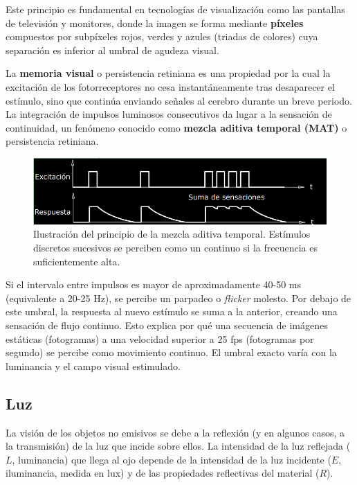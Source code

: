 Este principio es fundamental en tecnologías de visualización como las pantallas de televisión y monitores, donde la imagen se forma mediante \textbf{píxeles} compuestos por subpíxeles rojos, verdes y azules (triadas de colores) cuya separación es inferior al umbral de agudeza visual.

La \textbf{memoria visual} o persistencia retiniana es una propiedad por la cual la excitación de los fotorreceptores no cesa instantáneamente tras desaparecer el estímulo, sino que continúa enviando señales al cerebro durante un breve periodo. La integración de impulsos luminosos consecutivos da lugar a la sensación de continuidad, un fenómeno conocido como \textbf{mezcla aditiva temporal (MAT)} o persistencia retiniana.

\begin{figure}[h]
\centering
\includegraphics[width = \textwidth]{figs/mat.png}
\caption{Ilustración del principio de la mezcla aditiva temporal. Estímulos discretos sucesivos se perciben como un continuo si la frecuencia es suficientemente alta.}
\end{figure}

Si el intervalo entre impulsos es mayor de aproximadamente 40-50 ms (equivalente a 20-25 Hz), se percibe un parpadeo o \textit{flicker} molesto. Por debajo de este umbral, la respuesta al nuevo estímulo se suma a la anterior, creando una sensación de flujo continuo. Esto explica por qué una secuencia de imágenes estáticas (fotogramas) a una velocidad superior a 25 fps (fotogramas por segundo) se percibe como movimiento continuo. El umbral exacto varía con la luminancia y el campo visual estimulado.

\subsection{Luz}
La visión de los objetos no emisivos se debe a la reflexión (y en algunos casos, a la transmisión) de la luz que incide sobre ellos. La intensidad de la luz reflejada ($L$, luminancia) que llega al ojo depende de la intensidad de la luz incidente ($E$, iluminancia, medida en lux) y de las propiedades reflectivas del material ($R$).

